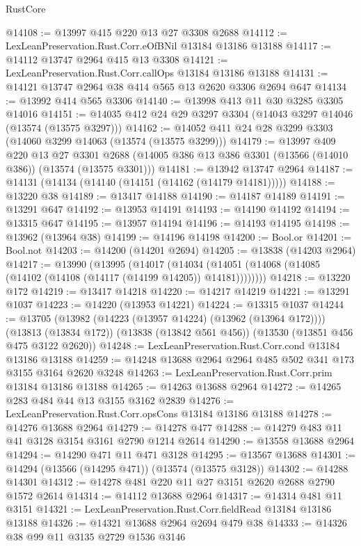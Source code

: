 \begin{lexlean}{RustCore}
\begin{coremodule}
@14108 := @13997 @415 @220 @13 @27 @3308 @2688
@14112 := LexLeanPreservation.Rust.Corr.eOfBNil @13184 @13186 @13188
@14117 := @14112 @13747 @2964 @415 @13 @3308
@14121 := LexLeanPreservation.Rust.Corr.callOps @13184 @13186 @13188
@14131 := @14121 @13747 @2964 @38 @414 @565 @13 @2620 @3306 @2694 @647
@14134 := @13992 @414 @565 @3306
@14140 := @13998 @413 @11 @30 @3285 @3305 @14016
@14151 := @14035 @412 @24 @29 @3297 @3304 (@14043 @3297 @14046 (@13574 (@13575 @3297)))
@14162 := @14052 @411 @24 @28 @3299 @3303 (@14060 @3299 @14063 (@13574 (@13575 @3299)))
@14179 := @13997
    @409
    @220
    @13
    @27
    @3301
    @2688
    (@14005 @386 @13 @386 @3301 (@13566 (@14010 @386)) (@13574 (@13575 @3301)))
@14181 := @13942 @13747 @2964
@14187 := @14131 (@14134 (@14140 (@14151 (@14162 (@14179 @14181)))))
@14188 := @13220 @38
@14189 := @13417 @14188
@14190 := @14187 @14189
@14191 := @13291 @647
@14192 := @13953 @14191
@14193 := @14190 @14192
@14194 := @13315 @647
@14195 := @13957 @14194
@14196 := @14193 @14195
@14198 := @13962 (@13964 @38)
@14199 := @14196 @14198
@14200 := Bool.or
@14201 := Bool.not
@14203 := @14200 (@14201 @2694)
@14205 := @13838 (@14203 @2964)
@14217 := @13990
    (@13995
      (@14017
        (@14034 (@14051 (@14068 (@14085 (@14102 (@14108 (@14117 (@14199 @14205)) @14181))))))))
@14218 := @13220 @172
@14219 := @13417 @14218
@14220 := @14217 @14219
@14221 := @13291 @1037
@14223 := @14220 (@13953 @14221)
@14224 := @13315 @1037
@14244 := @13705
    (@13982 (@14223 (@13957 @14224) (@13962 (@13964 @172))))
    (@13813 (@13834 @172))
    (@13838 (@13842 @561 @456))
    (@13530 (@13851 @456 @475 @3122 @2620))
@14248 := LexLeanPreservation.Rust.Corr.cond @13184 @13186 @13188
@14259 := @14248 @13688 @2964 @2964 @485 @502 @341 @173 @3155 @3164 @2620 @3248
@14263 := LexLeanPreservation.Rust.Corr.prim @13184 @13186 @13188
@14265 := @14263 @13688 @2964
@14272 := @14265 @283 @484 @44 @13 @3155 @3162 @2839
@14276 := LexLeanPreservation.Rust.Corr.opsCons @13184 @13186 @13188
@14278 := @14276 @13688 @2964
@14279 := @14278 @477
@14288 := @14279 @483 @11 @41 @3128 @3154 @3161 @2790 @1214 @2614
@14290 := @13558 @13688 @2964
@14294 := @14290 @471 @11 @471 @3128
@14295 := @13567 @13688
@14301 := @14294 (@13566 (@14295 @471)) (@13574 (@13575 @3128))
@14302 := @14288 @14301
@14312 := @14278 @481 @220 @11 @27 @3151 @2620 @2688 @2790 @1572 @2614
@14314 := @14112 @13688 @2964
@14317 := @14314 @481 @11 @3151
@14321 := LexLeanPreservation.Rust.Corr.fieldRead @13184 @13186 @13188
@14326 := @14321 @13688 @2964 @2694 @479 @38
@14333 := @14326 @38 @99 @11 @3135 @2729 @1536 @3146

\end{coremodule}
\end{lexlean}
